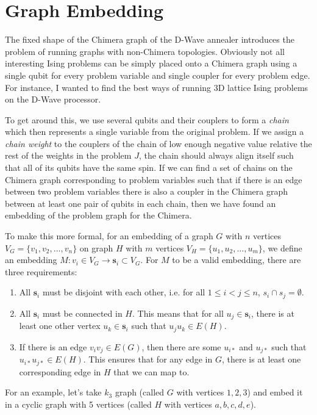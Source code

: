 \documentclass[11pt]{report}
\newcommand{\?}{\stackrel{?}{=}}
\begin{document}
\section{Graph Embedding}

The fixed shape of the Chimera graph of the D-Wave annealer introduces the problem of running graphs with non-Chimera topologies. Obviously not all interesting Ising problems can be simply placed onto a Chimera graph using a single qubit for every problem variable and single coupler for every problem edge. For instance, I wanted to find the best ways of running 3D lattice Ising problems on the D-Wave processor.

To get around this, we use several qubits and their couplers to form a \textit{chain} which then represents a single variable from the original problem. If we assign a \textit{chain weight} to the couplers of the chain of low enough negative value relative the rest of the weights in the problem $J$, the chain should always align itself such that all of its qubits have the same spin. If we can find a set of chains on the Chimera graph corresponding to problem variables such that if there is an edge between two problem variables there is also a coupler in the Chimera graph between at least one pair of qubits in each chain, then we have found an embedding of the problem graph for the Chimera.

To make this more formal, for an embedding of a graph $G$ with $n$ vertices $V_G = \{v_1, v_2, \ldots, v_n\}$ on graph $H$ with $m$ vertices $V_H = \{u_1, u_2, \ldots, u_m\}$, we define an embedding $M: v_i \in V_G \rightarrow \mathbf{s}_i \subset V_G$. For $M$ to be a valid embedding, there are three requirements:
\begin{enumerate}
	\item All $\mathbf{s}_i$ must be disjoint with each other, i.e. for all $1 \leq i < j \leq n$, $s_i \cap s_j = \emptyset$.
	\item All $\mathbf{s}_i$ must be connected in $H$. This means that for all $u_j \in \mathbf{s}_i$, there is at least one other vertex $u_k \in \mathbf{s}_i$ such that $u_ju_k \in E(H)$.
	\item If there is an edge $v_iv_j \in E(G)$, then there are some $u_{i*}$ and $u_{j*}$ such that $u_{i*}u_{j*} \in E(H)$. This ensures that for any edge in $G$, there is at least one corresponding edge in $H$ that we can map to.
\end{enumerate}

For an example, let's take $k_3$ graph (called $G$ with vertices $1,2,3$) and embed it in a cyclic graph with 5 vertices (called $H$ with vertices $a,b,c,d,e$).
\end{document}
